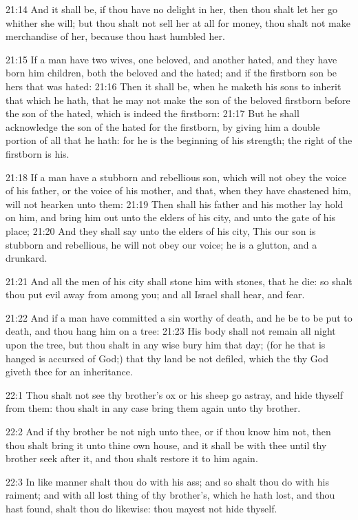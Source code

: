 21:14 And it shall be, if thou have no delight in her, then thou shalt
let her go whither she will; but thou shalt not sell her at all for
money, thou shalt not make merchandise of her, because thou hast
humbled her.

21:15 If a man have two wives, one beloved, and another hated, and
they have born him children, both the beloved and the hated; and if
the firstborn son be hers that was hated: 21:16 Then it shall be, when
he maketh his sons to inherit that which he hath, that he may not make
the son of the beloved firstborn before the son of the hated, which is
indeed the firstborn: 21:17 But he shall acknowledge the son of the
hated for the firstborn, by giving him a double portion of all that he
hath: for he is the beginning of his strength; the right of the
firstborn is his.

21:18 If a man have a stubborn and rebellious son, which will not obey
the voice of his father, or the voice of his mother, and that, when
they have chastened him, will not hearken unto them: 21:19 Then shall
his father and his mother lay hold on him, and bring him out unto the
elders of his city, and unto the gate of his place; 21:20 And they
shall say unto the elders of his city, This our son is stubborn and
rebellious, he will not obey our voice; he is a glutton, and a
drunkard.

21:21 And all the men of his city shall stone him with stones, that he
die: so shalt thou put evil away from among you; and all Israel shall
hear, and fear.

21:22 And if a man have committed a sin worthy of death, and he be to
be put to death, and thou hang him on a tree: 21:23 His body shall not
remain all night upon the tree, but thou shalt in any wise bury him
that day; (for he that is hanged is accursed of God;) that thy land be
not defiled, which the \LORD thy God giveth thee for an inheritance.

22:1 Thou shalt not see thy brother's ox or his sheep go astray, and
hide thyself from them: thou shalt in any case bring them again unto
thy brother.

22:2 And if thy brother be not nigh unto thee, or if thou know him
not, then thou shalt bring it unto thine own house, and it shall be
with thee until thy brother seek after it, and thou shalt restore it
to him again.

22:3 In like manner shalt thou do with his ass; and so shalt thou do
with his raiment; and with all lost thing of thy brother's, which he
hath lost, and thou hast found, shalt thou do likewise: thou mayest
not hide thyself.

